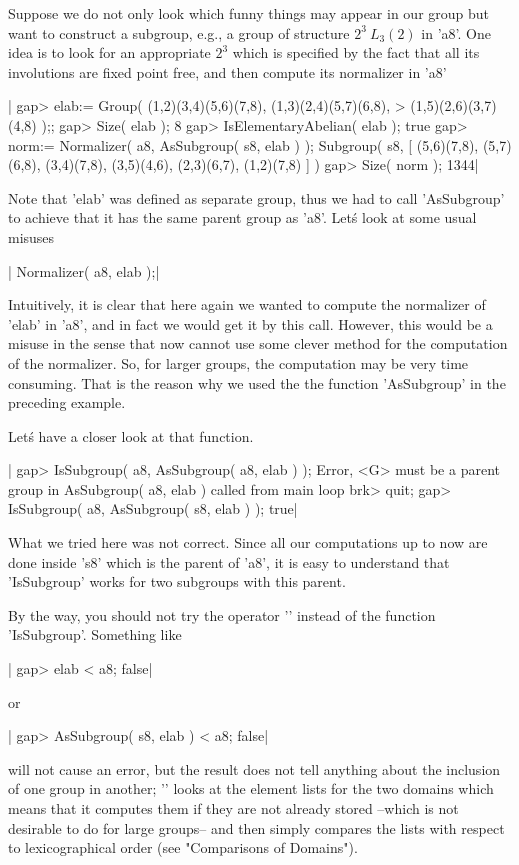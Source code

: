 Suppose we do  not only  look which funny  things may appear in our group
but  want   to   construct  a  subgroup,  e.g.,  a  group   of  structure
$2^3\:L_3(2)$ in 'a8'.   One idea is  to  look for an  appropriate  $2^3$
which is specified by the fact that all its involutions  are  fixed point
free, and then compute its normalizer in 'a8'\:

|    gap> elab:= Group( (1,2)(3,4)(5,6)(7,8), (1,3)(2,4)(5,7)(6,8),
    >                  (1,5)(2,6)(3,7)(4,8) );;
    gap> Size( elab );
    8
    gap> IsElementaryAbelian( elab );
    true
    gap> norm:= Normalizer( a8, AsSubgroup( s8, elab ) );
    Subgroup( s8, [ (5,6)(7,8), (5,7)(6,8), (3,4)(7,8), (3,5)(4,6),
      (2,3)(6,7), (1,2)(7,8) ] )
    gap> Size( norm );
    1344|

Note that 'elab'  was defined as separate  group, thus  we  had  to  call
'AsSubgroup'  to  achieve that  it  has  the  same parent  group as 'a8'.
Let\'s look at some usual misuses\:

|    Normalizer( a8, elab );|

Intuitively,  it is  clear  that here  again  we  wanted  to  compute the
normalizer of 'elab' in 'a8',  and in fact  we would get it by this call.
However,  this would be a misuse in the sense  that now {\GAP} cannot use
some clever method for the computation of the normalizer.  So, for larger
groups,  the computation  may be very time consuming.  That is the reason
why we used the the function 'AsSubgroup' in the preceding example.

Let\'s have a closer look at that function.

|    gap> IsSubgroup( a8, AsSubgroup( a8, elab ) );
    Error, <G> must be a parent group in
    AsSubgroup( a8, elab ) called from
    main loop
    brk> quit;
    gap> IsSubgroup( a8, AsSubgroup( s8, elab ) );
    true|

What we tried here was not correct.  Since all our computations up to now
are  done  inside  's8'  which  is the  parent  of  'a8',  it is  easy to
understand that 'IsSubgroup' works for two subgroups with this parent.

By the way, you should not try the operator '\<'  instead of the function
'IsSubgroup'.  Something like

|    gap> elab < a8;
    false|

or

|    gap> AsSubgroup( s8, elab ) < a8;
    false|

will not cause an error, but the result does not tell anything  about the
inclusion of one  group in another; '\<' looks at the  element  lists for
the two domains which means that it computes them if they are not already
stored  --which is not desirable to do for large groups-- and then simply
compares  the   lists  with  respect   to  lexicographical   order   (see
"Comparisons of Domains").

